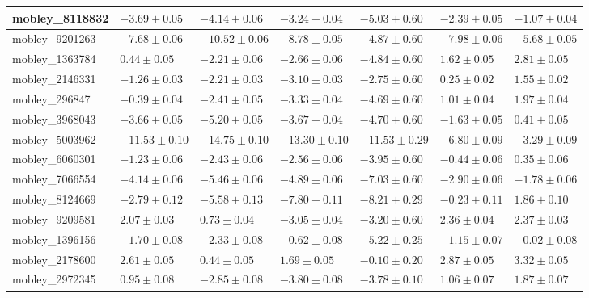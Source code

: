 \documentclass{article}
\begin{document}
\begin{landscape}
\begin{longtable}{|l{3.0cm}|l{3.0cm}|l{3.2cm}|l{3.6cm}|l{3.0cm}|l{3.0cm}|l{3.0cm}|}
mobley\_8118832	&	$	-3.69	\pm	0.05	$	&	$	-4.14	\pm	0.06	$	&	$	-3.24	\pm	0.04	$	&	$	-5.03	\pm	0.60	$	&	$	-2.39	\pm	0.05	$	&	$	-1.07	\pm	0.04	$	\\ \hline
mobley\_9201263	&	$	-7.68	\pm	0.06	$	&	$	-10.52	\pm	0.06	$	&	$	-8.78	\pm	0.05	$	&	$	-4.87	\pm	0.60	$	&	$	-7.98	\pm	0.06	$	&	$	-5.68	\pm	0.05	$	\\ \hline
mobley\_1363784	&	$	0.44	\pm	0.05	$	&	$	-2.21	\pm	0.06	$	&	$	-2.66	\pm	0.06	$	&	$	-4.84	\pm	0.60	$	&	$	1.62	\pm	0.05	$	&	$	2.81	\pm	0.05	$	\\ \hline
mobley\_2146331	&	$	-1.26	\pm	0.03	$	&	$	-2.21	\pm	0.03	$	&	$	-3.10	\pm	0.03	$	&	$	-2.75	\pm	0.60	$	&	$	0.25	\pm	0.02	$	&	$	1.55	\pm	0.02	$	\\ \hline
mobley\_296847	&	$	-0.39	\pm	0.04	$	&	$	-2.41	\pm	0.05	$	&	$	-3.33	\pm	0.04	$	&	$	-4.69	\pm	0.60	$	&	$	1.01	\pm	0.04	$	&	$	1.97	\pm	0.04	$	\\ \hline
mobley\_3968043	&	$	-3.66	\pm	0.05	$	&	$	-5.20	\pm	0.05	$	&	$	-3.67	\pm	0.04	$	&	$	-4.70	\pm	0.60	$	&	$	-1.63	\pm	0.05	$	&	$	0.41	\pm	0.05	$	\\ \hline
mobley\_5003962	&	$	-11.53	\pm	0.10	$	&	$	-14.75	\pm	0.10	$	&	$	-13.30	\pm	0.10	$	&	$	-11.53	\pm	0.29	$	&	$	-6.80	\pm	0.09	$	&	$	-3.29	\pm	0.09	$	\\ \hline
mobley\_6060301	&	$	-1.23	\pm	0.06	$	&	$	-2.43	\pm	0.06	$	&	$	-2.56	\pm	0.06	$	&	$	-3.95	\pm	0.60	$	&	$	-0.44	\pm	0.06	$	&	$	0.35	\pm	0.06	$	\\ \hline
mobley\_7066554	&	$	-4.14	\pm	0.06	$	&	$	-5.46	\pm	0.06	$	&	$	-4.89	\pm	0.06	$	&	$	-7.03	\pm	0.60	$	&	$	-2.90	\pm	0.06	$	&	$	-1.78	\pm	0.06	$	\\ \hline
mobley\_8124669	&	$	-2.79	\pm	0.12	$	&	$	-5.58	\pm	0.13	$	&	$	-7.80	\pm	0.11	$	&	$	-8.21	\pm	0.29	$	&	$	-0.23	\pm	0.11	$	&	$	1.86	\pm	0.10	$	\\ \hline
mobley\_9209581	&	$	2.07	\pm	0.03	$	&	$	0.73	\pm	0.04	$	&	$	-3.05	\pm	0.04	$	&	$	-3.20	\pm	0.60	$	&	$	2.36	\pm	0.04	$	&	$	2.37	\pm	0.03	$	\\ \hline
mobley\_1396156	&	$	-1.70	\pm	0.08	$	&	$	-2.33	\pm	0.08	$	&	$	-0.62	\pm	0.08	$	&	$	-5.22	\pm	0.25	$	&	$	-1.15	\pm	0.07	$	&	$	-0.02	\pm	0.08	$	\\ \hline
mobley\_2178600	&	$	2.61	\pm	0.05	$	&	$	0.44	\pm	0.05	$	&	$	1.69	\pm	0.05	$	&	$	-0.10	\pm	0.20	$	&	$	2.87	\pm	0.05	$	&	$	3.32	\pm	0.05	$	\\ \hline
mobley\_2972345	&	$	0.95	\pm	0.08	$	&	$	-2.85	\pm	0.08	$	&	$	-3.80	\pm	0.08	$	&	$	-3.78	\pm	0.10	$	&	$	1.06	\pm	0.07	$	&	$	1.87	\pm	0.07	$	\\ \hline

\end{longtable}
\end{landscape}
\end{document}
